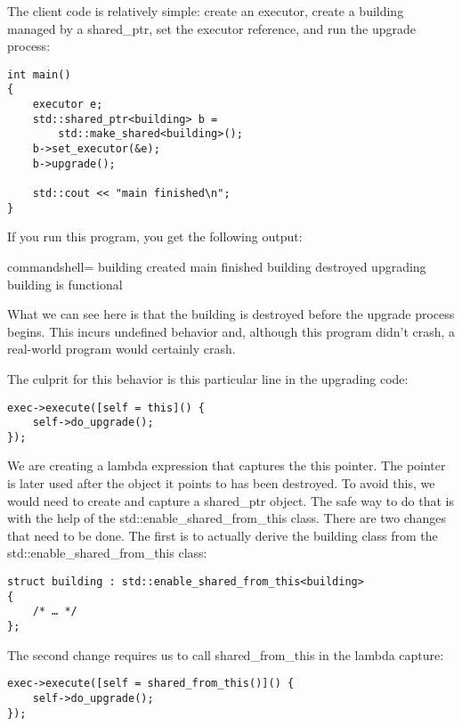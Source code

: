 The client code is relatively simple: create an executor, create a building managed by a shared\_ptr, set the executor reference, and run the upgrade process:

\begin{lstlisting}[style=styleCXX]
int main()
{
	executor e;
	std::shared_ptr<building> b =
		std::make_shared<building>();
	b->set_executor(&e);
	b->upgrade();
	
	std::cout << "main finished\n";
}
\end{lstlisting}

If you run this program, you get the following output:

\begin{tcblisting}{commandshell={}}
building created
main finished
building destroyed
upgrading
building is functional
\end{tcblisting}

What we can see here is that the building is destroyed before the upgrade process begins. This incurs undefined behavior and, although this program didn’t crash, a real-world program would certainly crash.

The culprit for this behavior is this particular line in the upgrading code:

\begin{lstlisting}[style=styleCXX]
exec->execute([self = this]() {
	self->do_upgrade();
});
\end{lstlisting}

We are creating a lambda expression that captures the this pointer. The pointer is later used after the object it points to has been destroyed. To avoid this, we would need to create and capture a shared\_ptr object. The safe way to do that is with the help of the std::enable\_shared\_from\_this class. There are two changes that need to be done. The first is to actually derive the building class from the std::enable\_shared\_from\_this class:

\begin{lstlisting}[style=styleCXX]
struct building : std::enable_shared_from_this<building>
{
	/* … */
};
\end{lstlisting}

The second change requires us to call shared\_from\_this in the lambda capture:

\begin{lstlisting}[style=styleCXX]
exec->execute([self = shared_from_this()]() {
	self->do_upgrade();
});
\end{lstlisting}

